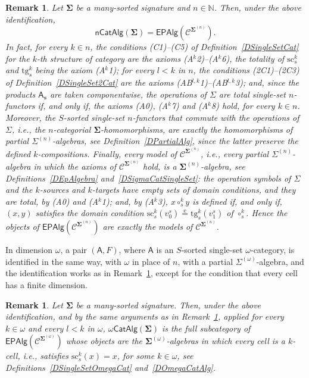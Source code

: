 \documentclass[a4paper, reqno
]{amsart}
\newcommand{\sig}[1]{\mathbf{#1}}             %
\newcommand{\spec}[1]{\boldsymbol{\mathcal{#1}}} %
\newcommand{\eeq}{\overset{\mathrm e}{=}}      %
\newcommand{\src}{\mathrm{sc}}
\newcommand{\tgt}{\mathrm{tg}}
\theoremstyle{plain}
\newtheorem{remark}[theorem]{Remark}
\theoremstyle{definition}
\begin{document}
\begin{remark}\label{RSingleSetIdent}
Let $\sig{\Sigma}$ be a many-sorted signature and $n\in\mathbb{N}$.
Then, under the above identification,
$$
\mathsf{nCatAlg}(\sig{\Sigma})=\mathsf{EPAlg}(\spec{C}^{\sig{\Sigma}^{(n)}}).
$$
In fact, for every $k\in n$, the conditions (C1)--(C5) of Definition~\ref{DSingleSetCat} for the $k$-th structure of category are the axioms (A$^{k}$2)--(A$^{k}$6), the totality of $\src^{k}_{s}$ and $\tgt^{k}_{s}$ being the axiom (A$^{k}$1); for every $l<k$ in $n$, the conditions (2C1)--(2C3) of Definition~\ref{DSingleSet2Cat} are the axioms (AB$^{l,k}$1)--(AB$^{l,k}$3); and, since the products $\mathsf{A}_{\mathbf{s}}$ are taken componentwise, the operations of $\Sigma$ are total single-set $n$-functors if, and only if, the axioms (A0), (A$^{k}$7) and (A$^{k}$8) hold, for every $k\in n$.
Moreover, the $S$-sorted single-set $n$-functors that commute with the operations of $\Sigma$, i.e., the $n$-categorial $\sig{\Sigma}$-homomorphisms, are exactly the homomorphisms of partial $\Sigma^{(n)}$-algebras, see Definition~\ref{DPartialAlg}, since the latter preserve the defined $k$-compositions.
Finally, every model of $\spec{C}^{\sig{\Sigma}^{(n)}}$, i.e., every partial $\Sigma^{(n)}$-algebra in which the axioms of $\mathcal{C}^{\sig{\Sigma}^{(n)}}$ hold, is a $\sig{\Sigma}^{(n)}$-algebra, see Definitions~\ref{DEpAlgebra} and~\ref{DSigmaCatSingleSet}: the operation symbols of $\Sigma$ and the $k$-sources and $k$-targets have empty sets of domain conditions, and they are total, by (A0) and (A$^{k}$1); and, by (A$^{k}$3), $x\circ^{k}_{s}y$ is defined if, and only if, $(x,y)$ satisfies the domain condition $\src^{k}_{s}(v^{s}_{0})\eeq\tgt^{k}_{s}(v^{s}_{1})$ of $\circ^{k}_{s}$.
Hence the objects of $\mathsf{EPAlg}(\spec{C}^{\sig{\Sigma}^{(n)}})$ are exactly the models of $\spec{C}^{\sig{\Sigma}^{(n)}}$.
\end{remark}

In dimension $\omega$, a pair $(\mathsf{A},F)$, where $\mathsf{A}$ is an $S$-sorted single-set $\omega$-category, is identified in the same way, with $\omega$ in place of $n$, with a partial $\Sigma^{(\omega)}$-algebra, and the identification works as in Remark~\ref{RSingleSetIdent}, except for the condition that every cell has a finite dimension.

\begin{remark}\label{RSingleSetIdentOmega}
Let $\sig{\Sigma}$ be a many-sorted signature.
Then, under the above identification, and by the same arguments as in Remark~\ref{RSingleSetIdent}, applied for every $k\in\omega$ and every $l<k$ in $\omega$, $\omega\mathsf{CatAlg}(\sig{\Sigma})$ is the full subcategory of $\mathsf{EPAlg}(\spec{C}^{\sig{\Sigma}^{(\omega)}})$ whose objects are the $\sig{\Sigma}^{(\omega)}$-algebras in which every cell is a $k$-cell, i.e., satisfies $\src^{k}_{s}(x)=x$, for some $k\in\omega$, see Definitions~\ref{DSingleSetOmegaCat} and~\ref{DOmegaCatAlg}.
\end{remark}
\end{document}
